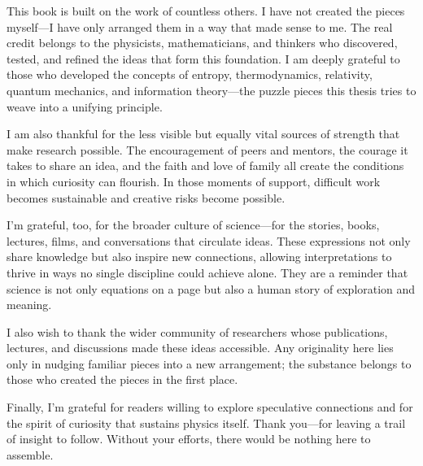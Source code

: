 
This book is built on the work of countless others. I have not created the pieces myself—I have only arranged them in a way that made sense to me. The real credit belongs to the physicists, mathematicians, and thinkers who discovered, tested, and refined the ideas that form this foundation. I am deeply grateful to those who developed the concepts of entropy, thermodynamics, relativity, quantum mechanics, and information theory—the puzzle pieces this thesis tries to weave into a unifying principle.

I am also thankful for the less visible but equally vital sources of strength that make research possible. The encouragement of peers and mentors, the courage it takes to share an idea, and the faith and love of family all create the conditions in which curiosity can flourish. In those moments of support, difficult work becomes sustainable and creative risks become possible.

I’m grateful, too, for the broader culture of science—for the stories, books, lectures, films, and conversations that circulate ideas. These expressions not only share knowledge but also inspire new connections, allowing interpretations to thrive in ways no single discipline could achieve alone. They are a reminder that science is not only equations on a page but also a human story of exploration and meaning.

I also wish to thank the wider community of researchers whose publications, lectures, and discussions made these ideas accessible. Any originality here lies only in nudging familiar pieces into a new arrangement; the substance belongs to those who created the pieces in the first place.

Finally, I’m grateful for readers willing to explore speculative connections and for the spirit of curiosity that sustains physics itself. Thank you—for leaving a trail of insight to follow. Without your efforts, there would be nothing here to assemble.
